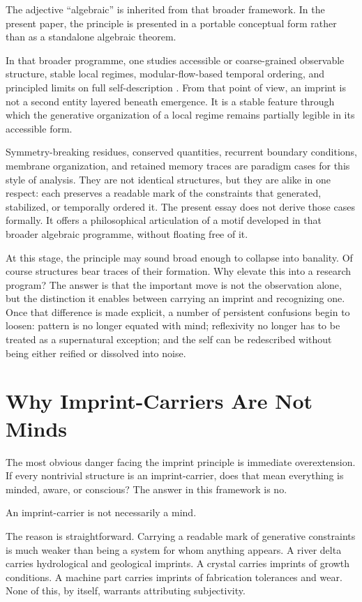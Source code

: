 \documentclass[12pt]{article}
\begin{document}
The adjective ``algebraic'' is inherited from that broader framework. In the present paper, the principle is presented in a portable conceptual form rather than as a standalone algebraic theorem.

In that broader programme, one studies accessible or coarse-grained observable structure, stable local regimes, modular-flow-based temporal ordering, and principled limits on full self-description \cite{Liu2026HAFF_A,Liu2026HAFF_C,Liu2026HAFF_G,Liu2026CS_III}. From that point of view, an imprint is not a second entity layered beneath emergence. It is a stable feature through which the generative organization of a local regime remains partially legible in its accessible form.

Symmetry-breaking residues, conserved quantities, recurrent boundary conditions, membrane organization, and retained memory traces are paradigm cases for this style of analysis. They are not identical structures, but they are alike in one respect: each preserves a readable mark of the constraints that generated, stabilized, or temporally ordered it. The present essay does not derive those cases formally. It offers a philosophical articulation of a motif developed in that broader algebraic programme, without floating free of it.

At this stage, the principle may sound broad enough to collapse into banality. Of course structures bear traces of their formation. Why elevate this into a research program? The answer is that the important move is not the observation alone, but the distinction it enables between carrying an imprint and recognizing one. Once that difference is made explicit, a number of persistent confusions begin to loosen: pattern is no longer equated with mind; reflexivity no longer has to be treated as a supernatural exception; and the self can be redescribed without being either reified or dissolved into noise.

\section{Why Imprint-Carriers Are Not Minds}

The most obvious danger facing the imprint principle is immediate overextension. If every nontrivial structure is an imprint-carrier, does that mean everything is minded, aware, or conscious? The answer in this framework is no.

An imprint-carrier is not necessarily a mind.

The reason is straightforward. Carrying a readable mark of generative constraints is much weaker than being a system for whom anything appears. A river delta carries hydrological and geological imprints. A crystal carries imprints of growth conditions. A machine part carries imprints of fabrication tolerances and wear. None of this, by itself, warrants attributing subjectivity.
\end{document}
